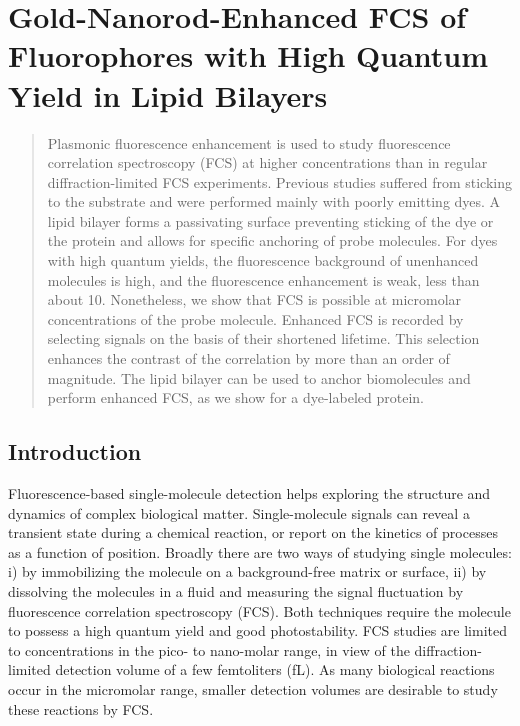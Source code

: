 \chapter{Gold-Nanorod-Enhanced FCS of Fluorophores with High Quantum Yield in Lipid Bilayers}
\label{chapter:EFCS}


\begin{abstract}
	Plasmonic fluorescence enhancement is used to study fluorescence correlation spectroscopy (FCS) at higher concentrations than in regular diffraction-limited FCS experiments. Previous studies suffered from sticking to the substrate and were performed mainly with poorly emitting dyes.  A lipid bilayer forms a passivating surface preventing sticking of the dye or the protein and allows for specific anchoring of probe molecules. For dyes with high quantum yields, the fluorescence background of unenhanced molecules is high, and the fluorescence enhancement is weak, less than about 10. Nonetheless, we show that FCS is possible at micromolar concentrations of the probe molecule. Enhanced FCS is recorded by selecting signals on the basis of their shortened lifetime. This selection enhances the contrast of the correlation by more than an order of magnitude. The lipid bilayer can be used to anchor biomolecules and perform enhanced FCS, as we show for a dye-labeled protein.
\end{abstract}

\section{Introduction}
Fluorescence-based single-molecule detection helps exploring the structure and dynamics of complex biological matter.\cite{moerner1999illuminating} Single-molecule signals can reveal a transient state during a chemical reaction, or report on the kinetics of processes as a function of position. Broadly there are two ways of studying single molecules: i) by immobilizing the molecule on a background-free matrix or surface, ii) by dissolving the molecules in a fluid and measuring the signal fluctuation by fluorescence correlation spectroscopy (FCS).\cite{Magde1972} Both techniques require the molecule to possess a high quantum yield and good photostability. FCS studies are limited to concentrations in the pico- to nano-molar range, in view of the diffraction-limited detection volume of a few femtoliters (fL). As many biological reactions occur in the micromolar range\cite{craighead2006future}, smaller detection volumes are desirable to study these reactions by FCS.

